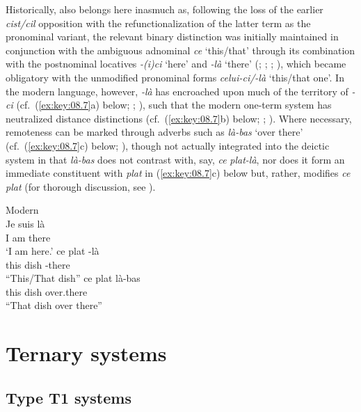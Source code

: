 \documentclass[output=paper]{langsci/langscibook}
\begin{document}
Historically,  also belongs here inasmuch as, following the loss of the
earlier \emph{cist/cil} opposition with the refunctionalization of the latter
term as the pronominal variant, the relevant binary distinction was initially
maintained in conjunction with the ambiguous adnominal \emph{ce} ‘this/that’
through its combination with the postnominal locatives
\emph{\nobreakdash-(i)ci} ‘here’ and \emph{{}-là} ‘there’
(\citealt[325]{Brunot:1899a}; \citealt[424f]{Nyrop:1925a};
\citealt[292f]{Nyrop:1925ab}; \citealt[123, 126]{Price:1971a}), which became
obligatory with the unmodified pronominal forms \emph{celui\nobreakdash-ci/-là}
‘this/that one’. In the modern language, however, \emph{\nobreakdash-là} has
encroached upon much of the territory of \emph{{}-ci} (cf.\ (\ref{ex:key:08.7}a) below;
\citealt[127]{Price:1971a}; \citealt[§2]{Smith:1995a}), such
that the modern  one-term system has neutralized distance distinctions
(cf.\ (\ref{ex:key:08.7}b) below; \citealt[§3.4]{Da-Milano:2007a}; \citealt[67f]{Rowlett:2007a}).
Where necessary, remoteness can be marked through adverbs such as \emph{là-bas}
‘over there’ (cf.\ (\ref{ex:key:08.7}c) below; \citealt{Brault:2004a}), though not actually
integrated into the deictic system in that \emph{là-bas} does not contrast
with, say, \emph{ce} \emph{plat-là}, nor does it form an immediate constituent
with \emph{plat} in (\ref{ex:key:08.7}c) below but, rather, modifies \emph{ce}
\emph{plat} (for thorough discussion, see \citealt[n.5]{Smith:1995a}).

\ea\label{ex:key:08.7}Modern  \citep{Smith:1995a}\\
\ea
\gll  Je  suis  là\\
I  am  there\\
\glt \enquote*{I am here.}
\ex
\gll  ce  plat  {}-là\\
this  dish  {}-there\\
\glt \enquote{This/That dish}
\ex
\gll  ce  plat  là-bas\\
this  dish  over.there\\
\glt \enquote{That dish over there}
\z
\z

\section{Ternary systems}\label{bkm:Ref370483101}

\subsection{Type T1 systems}
\end{document}
